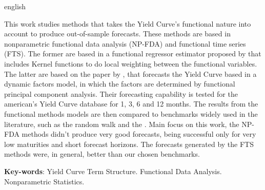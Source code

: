 \documentclass[
	12pt,				%
	openright,			%
	oneside,			%
	a4paper,			%
	english,			%
	brazil				%
	]{dissertacao-ufrgs-abntex2}
\begin{document}
\begin{resumo}[Abstract]
 \begin{otherlanguage*}{english}

This work studies methods that takes the Yield Curve's functional nature  into account to produce out-of-sample forecasts. These methods are based in nonparametric functional data analysis (NP-FDA) and functional time series (FTS). The former are based in a functional regressor estimator proposed by  that includes Kernel functions to do local weighting between the functional variables. The latter are based on the paper by , that forecasts the Yield Curve based in a dynamic factors model, in which the factors are determined by functional principal component analysis. Their forecasting capability is tested for the american's Yield Curve database for 1, 3, 6 and 12 months. The results from the functional methods models are then compared to benchmarks widely used in the literature, such as the random walk and the . Main focus on this work, the NP-FDA methods didn't produce very good forecasts, being successful only for very low maturities and short forecast horizons. The forecasts generated by the FTS methods were, in general, better than our chosen benchmarks.

   \vspace{\onelineskip}

   \noindent 
   \textbf{Key-words}: Yield Curve Term Structure. Functional Data Analysis. Nonparametric Statistics.
 \end{otherlanguage*}
\end{resumo}


\end{document}
